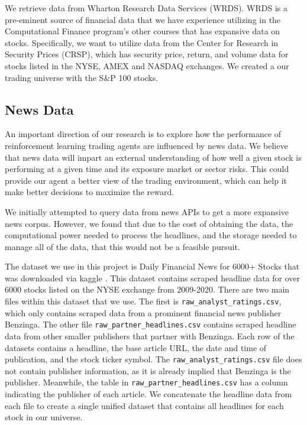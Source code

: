 We retrieve data from Wharton Research Data Services 
(WRDS). WRDS is a pre-eminent source of financial data that we have experience 
utilizing in the Computational Finance program’s other courses that has expansive 
data on stocks. Specifically, we want to utilize data from the Center for Research in 
Security Prices (CRSP), which has security price, return, and volume data for stocks listed in the 
NYSE, AMEX and NASDAQ exchanges. We created a our trading universe with the S$\&$P 100 stocks.

\subsection{News Data}

An important direction of our research is to explore how the performance 
of reinforcement learning trading agents are influenced by news data.
We believe that news data will impart an external understanding of how 
well a given stock is performing at a given time and its exposure market or sector risks. 
This could provide our agent a better view of the trading environment, which 
can help it make better decisions to maximize the reward. 

We initially attempted to query data from news APIs to get a more expansive news corpus. However, we found that due to the cost of obtaining the data, the computational power needed to process the headlines, and the storage needed to manage all of the data, that this would not be a feasible pursuit.

The dataset we use in this project is Daily Financial News for 6000+ Stocks that was downloaded via kaggle \cite{financial_news}.
This dataset contains scraped headline data for over 6000 stocks listed on the NYSE exchange from 2009-2020. 
There are two main files within this dataset that we use. The first is \texttt{raw\_analyst\_ratings.csv}, which only contains scraped data from a prominent financial news publisher Benzinga.
The other file \texttt{raw\_partner\_headlines.csv} contains scraped headline data from other smaller publishers that partner with Benzinga. Each row of the datasets contains a headline, the base article URL, the date and time of publication, and the stock ticker symbol.
The \texttt{raw\_analyst\_ratings.csv} file does not contain publisher information, as it is already implied that Benzinga is the publisher. Meanwhile, the table in \texttt{raw\_partner\_headlines.csv} has a column indicating the publisher of each article. 
We concatenate the headline data from each file to create a single unified dataset that contains all headlines for each stock in our universe.


